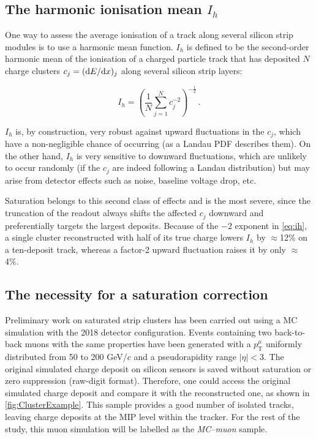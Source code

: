 \subsection{The harmonic ionisation mean \texorpdfstring{$I_h$}{Ih}}
\label{sec:ihpres}

One way to assess the average ionisation of a track along several silicon strip modules is to use a harmonic mean function. $I_h$ is defined to be the second-order harmonic mean of the ionisation of a charged particle track that has deposited $N$ charge clusters $c_j = (\mathrm{d}E/\mathrm{d}x)_j$ along several silicon strip layers:

\begin{equation}
    I_h = \left( \frac{1}{N} \sum_{j=1}^N c_j^{-2} \right)^{-\frac{1}{2}} \, .
    \label{eq:ih}
\end{equation}

\vspace{0.5 cm}

$I_h$ is, by construction, very robust against upward fluctuations in the $c_j$, which have a non-negligible chance of occurring (as a Landau PDF describes them). On the other hand, $I_h$ is very sensitive to downward fluctuations, which are unlikely to occur randomly (if the $c_j$ are indeed following a Landau distribution) but may arise from detector effects such as noise, baseline voltage drop, etc.

Saturation belongs to this second class of effects and is the most severe, since the truncation of the readout always shifts the affected $c_j$ downward and preferentially targets the largest deposits. Because of the $-2$ exponent in \cref{eq:ih}, a single cluster reconstructed with half of its true charge lowers $I_h$ by $\approx$12\% on a ten-deposit track, whereas a factor-2 upward fluctuation raises it by only $\approx$4\%.


\subsection{The necessity for a saturation correction}
\label{subsubsection:satstripclusters}

Preliminary work on saturated strip clusters has been carried out using a MC simulation with the 2018 detector configuration. Events containing two back-to-back muons with the same properties have been generated with a $p_{\mathrm{T}}^\mu$ uniformly distributed from 50 to 200 GeV/$c$ and a pseudorapidity range $|\eta|<3$. The original simulated charge deposit on silicon sensors is saved without saturation or zero suppression (raw-digit format). Therefore, one could access the original simulated charge deposit and compare it with the reconstructed one, as shown in \cref{fig:ClusterExample}. This sample provides a good number of isolated tracks, leaving charge deposits at the MIP level within the tracker. For the rest of the study, this muon simulation will be labelled as the \textit{MC--muon} sample.

